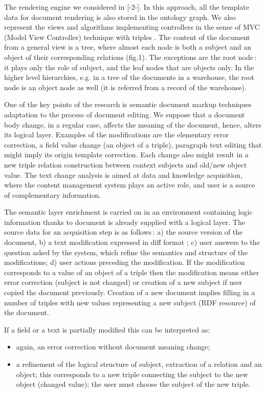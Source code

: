 \documentclass[conference]{IEEEtran}
\begin{document}
{{The rendering engine we considered in [-2-]. In this approach, all the template data for document rendering is also stored in the ontology graph. We also represent the views and algorithms implementing controllers in the sense of MVC (Model View Controller) technique with triples \cite{b5}. The content of the document from a general view is a tree, where almost each node is both a subject and an object of their corresponding relations (fig.1). The exceptions are the root node\,: it plays only the role of subject, and the leaf nodes that are objects only. In the higher level hierarchies, e.g. in a tree of the documents in a warehouse, the root node is an object node as well (it is referred from a record of the warehouse).

One of the key points of the research is semantic document markup techniques adaptation to the process of document editing. We suppose that a document body change, in a regular case, affects the meaning of the document, hence, alters its logical layer. Examples of the modifications are the elementary error correction, a field value change (an object of a triple), paragraph text editing that might imply its origin template correction. Each change also might result in a new triple relation construction between context subjects and old/new object value. The text change analysis is aimed at data and knowledge acquisition, where the content management system plays an active role, and user is a source of complementary information.

The semantic layer enrichment is carried on in an environment containing logic information thanks to document is already supplied with a logical layer. The source data for an acquisition step is as follows\,: a) the source version of the document, b) a text modification expressed in diff format \cite{b9}; c) user answers to the question asked by the system, which refine the semantics and structure of the modifications; d) user actions preceding the modification. If the modification corresponds to a value of an object of a triple then the modification means either error correction (subject is not changed) or creation of a new subject if user copied the document previously. Creation of a new document implies filling in a number of triples with new values representing a new subject (RDF resource) of the document.

If a field or a text is partially modified this can be interpreted as:
\begin{itemize}
\item again, an error correction without document meaning change;
\item a refinement of the logical structure of subject, extraction of a relation and an object; this corresponds to a new triple connecting the subject to the new object (changed value); the user must choose the subject of the new triple.
\end{itemize}

}}
\end{document}
